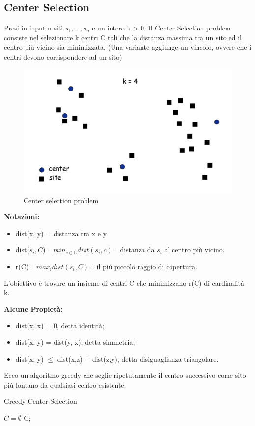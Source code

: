 \documentclass{article}
\begin{document}
\subsection{Center Selection}
Presi in input n siti $s_1, \dots, s_n$ e un intero k > 0. Il Center Selection problem consiste nel selezionare k centri C tali che la distanza massima tra un sito ed il centro più vicino sia minimizzata. (Una variante aggiunge un vincolo, ovvere che i centri devono corrispondere ad un sito)
\begin{figure}[H]
    \centering
    \includegraphics[width=0.5\linewidth]{SelectionCenter.png}
    \caption{Center selection problem}
    \label{fig:enter-label}
\end{figure}
\noindent\textbf{Notazioni:} 
\begin{itemize}
    \item dist(x, y) = distanza tra x e y
    \item dist($s_i, C$)= $min_{c\in C}dist(s_i,c)$= distanza da $s_i$ al centro più vicino.
    \item r(C)= $max_i dist(s_i, C)$= il più piccolo raggio di copertura.
\end{itemize}

\noindent L'obiettivo è trovare un insieme di centri C che minimizzano r(C) di cardinalità k.

\noindent \textbf{Alcune Propietà:}
\begin{itemize}
    \item dist(x, x) = 0, detta identità;
    \item dist(x, y) = dist(y, x), detta simmetria;
    \item dist(x, y) $\leq$ dist(x,z) + dist(z,y), detta disiguaglianza triangolare.
\end{itemize}

\noindent Ecco un algoritmo greedy che seglie ripetutamente il centro successivo come sito più lontano da qualsiasi centro esistente:

\newpage
\begin{center}
\begin{algorithm}
\caption{Greedy-Center-Selection}
$C=\emptyset$\;
\Return C;
\end{algorithm}
\end{center}
\end{document}
